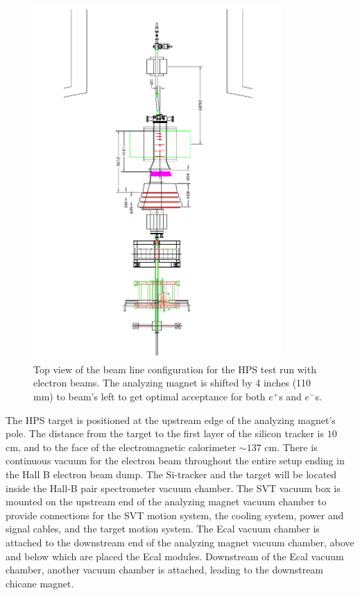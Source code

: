 \begin{figure}[htp]
\includegraphics[angle=180., width=0.85\textwidth]{beamline/HPS12_66840e051XX_PLAN.pdf}
\caption{\small{Top view of the beam line configuration for the HPS test run with electron beams. The analyzing magnet is shifted by 4 inches 
(110 mm) to beam's left to get optimal acceptance for both $e^+$s and $e^-$s.}}\label{fig:ebeamt}
\end{figure}

 
The HPS target is positioned at the upstream edge of the analyzing magnet's pole. The distance from the target to the first layer of the 
silicon tracker is $10$ cm, and to the face of the electromagnetic calorimeter $\sim 137$ cm. There is continuous vacuum for the electron 
beam throughout the entire setup ending in the Hall B electron beam dump. The Si-tracker and the target will be located inside the Hall-B 
pair spectrometer vacuum chamber. The SVT vacuum box is mounted on the upstream end of the analyzing magnet vacuum chamber to provide 
connections for the SVT motion system, the cooling system, power and signal cables, and the target motion system. The Ecal vacuum chamber 
is attached to the downstream end of the analyzing magnet vacuum chamber, above and below which are placed the Ecal modules. Downstream of 
the Ecal vacuum chamber, another vacuum chamber is attached, leading to the downstream chicane magnet.

